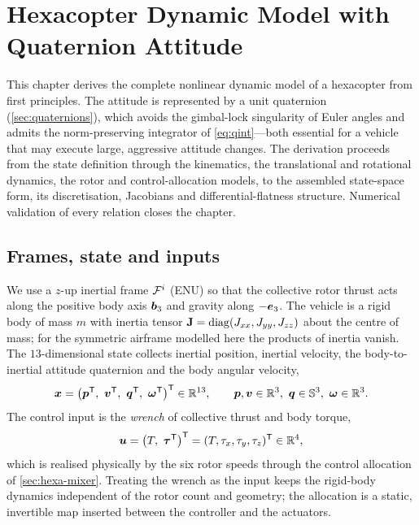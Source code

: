 \chapter{Hexacopter Dynamic Model with Quaternion Attitude}
\label{ch:hexacopter}

This chapter derives the complete nonlinear dynamic model of a hexacopter from
first principles. The attitude is represented by a unit quaternion
(\cref{sec:quaternions}), which avoids the gimbal-lock singularity of Euler
angles and admits the norm-preserving integrator of \cref{eq:qint}---both
essential for a vehicle that may execute large, aggressive attitude changes. The
derivation proceeds from the state definition through the kinematics, the
translational and rotational dynamics, the rotor and control-allocation models,
to the assembled state-space form, its discretisation, Jacobians and
differential-flatness structure. Numerical validation of every relation closes
the chapter.

\section{Frames, state and inputs}

We use a $z$-up inertial frame $\mathcal{F}^{i}$ (ENU) so that the collective rotor
thrust acts along the positive body axis $\bm{b}_3$ and gravity along
$-\bm{e}_3$. The vehicle is a rigid body of mass $m$ with inertia tensor
$\mathbf{J}=\operatorname{diag}(J_{xx},J_{yy},J_{zz})$ about the centre of mass; for the symmetric
airframe modelled here the products of inertia vanish. The $13$-dimensional state
collects inertial position, inertial velocity, the body-to-inertial attitude
quaternion and the body angular velocity,
\begin{equation}
\state=\bigl(\vv{p}\T,\ \vv{v}\T,\ \quat{q}\T,\ \vv{\omega}\T\bigr)\T\in\R^{13},
\qquad
\vv{p},\vv{v}\in\R^3,\ \quat{q}\in\Sph^3,\ \vv{\omega}\in\R^3.
\label{eq:hexa-state}
\end{equation}
The control input is the \emph{wrench} of collective thrust and body torque,
\begin{equation}
\ctrl=\bigl(T,\ \vv{\tau}\T\bigr)\T=(T,\tau_x,\tau_y,\tau_z)\T\in\R^4,
\label{eq:hexa-input}
\end{equation}
which is realised physically by the six rotor speeds through the control
allocation of \cref{sec:hexa-mixer}. Treating the wrench as the input keeps the
rigid-body dynamics independent of the rotor count and geometry; the allocation
is a static, invertible map inserted between the controller and the actuators.

